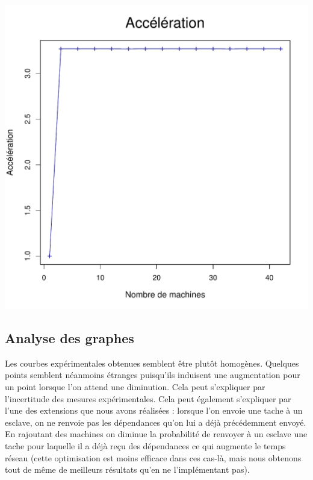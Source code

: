 \documentclass[a4paper, 11pt, titlepage]{article}
\begin{document}
\begin{center}
    \includegraphics[scale=0.45]{res/sujet_makefiles_premier_Makefile_nth8_acc.pdf}
\end{center}

\subsection {Analyse des graphes}

Les courbes expérimentales obtenues semblent être plutôt homogènes. Quelques points semblent néanmoins étranges puisqu'ils induisent une augmentation pour un point lorsque l'on attend une diminution. Cela peut s'expliquer par l'incertitude des mesures expérimentales. Cela peut également s'expliquer par l'une des extensions que nous avons réalisées : lorsque l'on envoie une tache à un esclave, on ne renvoie pas les dépendances qu'on lui a déjà précédemment envoyé. En rajoutant des machines on diminue la probabilité de renvoyer à un esclave une tache pour laquelle il a déjà reçu des dépendances ce qui augmente le temps réseau (cette optimisation est moins efficace dans ces cas-là, mais nous obtenons tout de même de meilleurs résultats qu'en ne l'implémentant pas).
\end{document}
